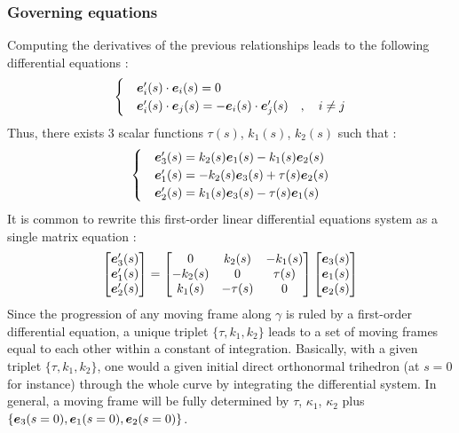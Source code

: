 \subsubsection{Governing equations}
Computing the derivatives of the previous relationships leads to the following differential equations :
\begin{equation}
\begin{cases}
&\boldsymbol{e}'_i(s) \cdot \boldsymbol{e}_i(s) = 0 \\
&\boldsymbol{e}'_{i}(s) \cdot \boldsymbol{e}_{j}(s) = -\boldsymbol{e}_{i}(s) \cdot \boldsymbol{e}'_{j}(s)\quad , \quad i \neq j
\end{cases}
\end{equation}
Thus, there exists 3 scalar functions $\tau(s)$, $k_{1}(s)$, $k_{2}(s)$ such that :
\begin{equation}
\begin{cases}
&\boldsymbol{e}'_{3}(s) = k_{2}(s)\boldsymbol{e}_{1}(s) - k_{1}(s)\boldsymbol{e}_{2}(s) \\
&\boldsymbol{e}'_{1}(s) = -k_{2}(s)\boldsymbol{e}_{3}(s) + \tau(s)\boldsymbol{e}_{2}(s) \\
&\boldsymbol{e}'_{2}(s) = k_{1}(s)\boldsymbol{e}_{3}(s) - \tau(s)\boldsymbol{e}_{1}(s)
\end{cases}
\end{equation}
It is common to rewrite this first-order linear differential equations system as a single matrix equation :
\begin{equation}
	\begin{bmatrix}
		\boldsymbol{e}'_{3}(s) \\
		\boldsymbol{e}'_{1}(s) \\
		\boldsymbol{e}'_{2}(s)
	\end{bmatrix}
	=
	\begin{bmatrix}
		0 & k_{2}(s) & -k_{1}(s) \\
		-k_{2}(s) & 0 & \tau(s) \\
		k_{1}(s) & -\tau(s) & 0
	\end{bmatrix}
	\begin{bmatrix}
		\boldsymbol{e}_{3}(s) \\
		\boldsymbol{e}_{1}(s) \\
		\boldsymbol{e}_{2}(s)
	\end{bmatrix}
\label{eq:3_12}
\end{equation}
Since the progression of any moving frame along $\gamma$ is ruled by a first-order differential equation, a unique triplet $\{\tau, k_{1}, k_{2}\}$ leads to a set of moving frames equal to each other within a constant of integration. Basically, with a given triplet $\{\tau, k_{1}, k_{2}\}$, one would  a given initial direct orthonormal trihedron (at $s=0$ for instance) through the whole curve by integrating the differential system. In general, a moving frame will be fully determined by $\tau$, $\kappa_{1}$, $\kappa_{2}$ plus $\{\boldsymbol{e}_{3}(s=0),\boldsymbol{e}_{1}(s=0),\boldsymbol{e}_{2}(s=0)\}$.


